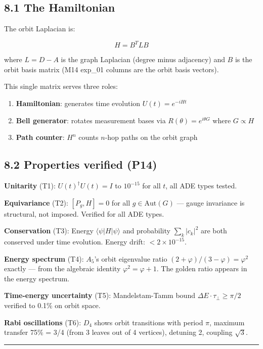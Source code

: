 \documentclass[11pt,a4paper]{article}
\providecommand{\tightlist}{\setlength{\itemsep}{0pt}\setlength{\parskip}{0pt}}
\begin{document}
\subsection*{8.1 The Hamiltonian}

The orbit Laplacian is:

\[H = B^T L B\]

where $L = D - A$ is the graph Laplacian (degree minus adjacency) and $B$ is the orbit basis matrix (M14 exp\_01 columns are the orbit basis vectors).

This single matrix serves three roles:
\begin{enumerate}\tightlist
\item \textbf{Hamiltonian}: generates time evolution $U(t) = e^{-iHt}$
\item \textbf{Bell generator}: rotates measurement bases via $R(\theta) = e^{i\theta G}$ where $G \propto H$
\item \textbf{Path counter}: $H^n$ counts $n$-hop paths on the orbit graph
\end{enumerate}

\subsection*{8.2 Properties verified (P14)}

\textbf{Unitarity} (T1): $U(t)^{\dagger} U(t) = I$ to $10^{-15}$ for all $t$, all ADE types tested.

\textbf{Equivariance} (T2): $[P_g, H] = 0$ for all $g \in \text{Aut}(G)$ — gauge invariance is structural, not imposed. Verified for all ADE types.

\textbf{Conservation} (T3): Energy $\langle \psi | H | \psi \rangle$ and probability $\sum_k |c_k|^2$ are both conserved under time evolution. Energy drift: $< 2 \times 10^{-15}$.

\textbf{Energy spectrum} (T4): $A_5$'s orbit eigenvalue ratio $(2 + \varphi)/(3 - \varphi) = \varphi^2$ exactly — from the algebraic identity $\varphi^2 = \varphi + 1$. The golden ratio appears in the energy spectrum.

\textbf{Time-energy uncertainty} (T5): Mandelstam-Tamm bound $\Delta E \cdot \tau_{\perp} \geq \pi/2$ verified to 0.1\% on orbit space.

\textbf{Rabi oscillations} (T6): $D_4$ shows orbit transitions with period $\pi$, maximum transfer 75\% = 3/4 (from 3 leaves out of 4 vertices), detuning 2, coupling $\sqrt{3}$.

\begin{center}\rule{0.5\linewidth}{0.4pt}\end{center}
\end{document}
